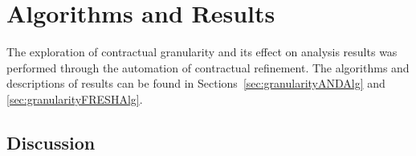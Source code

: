 \section{Algorithms and Results}
The exploration of contractual granularity and its effect on analysis results was performed through the automation of contractual refinement. The algorithms and descriptions of results can be found in Sections~\ref{sec:granularityANDAlg} and \ref{sec:granularityFRESHAlg}. %



%
%


\subsection{Discussion}